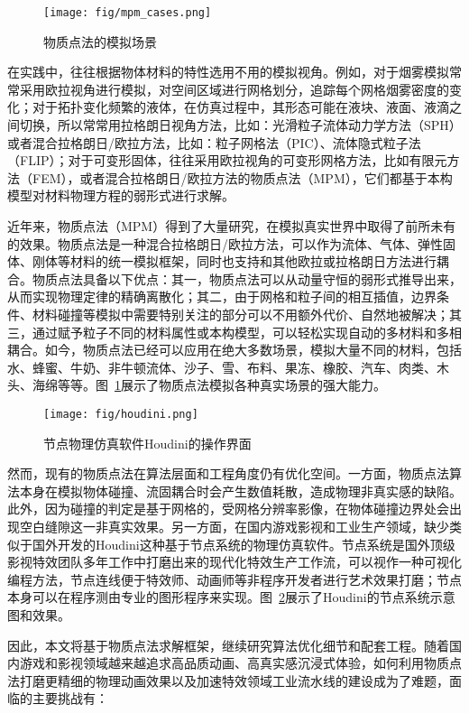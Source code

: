 \begin{figure}[htbp]
    \centering
    \texttt{[image: fig/mpm\_cases.png]}
    \caption{物质点法的模拟场景}
    \label{fig:mpm-cases}
\end{figure}

在实践中，往往根据物体材料的特性选用不用的模拟视角。例如，对于烟雾模拟常常采用欧拉视角进行模拟，对空间区域进行网格划分，追踪每个网格烟雾密度的变化；对于拓扑变化频繁的液体，在仿真过程中，其形态可能在液块、液面、液滴之间切换，所以常常用拉格朗日视角方法，比如：光滑粒子流体动力学方法（SPH）或者混合拉格朗日/欧拉方法，比如：粒子网格法（PIC）、流体隐式粒子法（FLIP）；对于可变形固体，往往采用欧拉视角的可变形网格方法，比如有限元方法（FEM），或者混合拉格朗日/欧拉方法的物质点法（MPM），它们都基于本构模型对材料物理方程的弱形式进行求解。

近年来，物质点法（MPM）得到了大量研究，在模拟真实世界中取得了前所未有的效果。物质点法是一种混合拉格朗日/欧拉方法，可以作为流体、气体、弹性固体、刚体等材料的统一模拟框架，同时也支持和其他欧拉或拉格朗日方法进行耦合。物质点法具备以下优点：其一，物质点法可以从动量守恒的弱形式推导出来，从而实现物理定律的精确离散化；其二，由于网格和粒子间的相互插值，边界条件、材料碰撞等模拟中需要特别关注的部分可以不用额外代价、自然地被解决；其三，通过赋予粒子不同的材料属性或本构模型，可以轻松实现自动的多材料和多相耦合。如今，物质点法已经可以应用在绝大多数场景，模拟大量不同的材料，包括水、蜂蜜、牛奶、非牛顿流体、沙子、雪、布料、果冻、橡胶、汽车、肉类、木头、海绵等等。图~\ref{fig:mpm-cases}展示了物质点法模拟各种真实场景的强大能力。

\begin{figure}[htbp]
    \centering
    \texttt{[image: fig/houdini.png]}
    \caption{节点物理仿真软件Houdini的操作界面}
    \label{fig:houdini}
\end{figure}

然而，现有的物质点法在算法层面和工程角度仍有优化空间。一方面，物质点法算法本身在模拟物体碰撞、流固耦合时会产生数值耗散，造成物理非真实感的缺陷。此外，因为碰撞的判定是基于网格的，受网格分辨率影像，在物体碰撞边界处会出现空白缝隙这一非真实效果。另一方面，在国内游戏影视和工业生产领域，缺少类似于国外开发的Houdini这种基于节点系统的物理仿真软件。节点系统是国外顶级影视特效团队多年工作中打磨出来的现代化特效生产工作流，可以视作一种可视化编程方法，节点连线便于特效师、动画师等非程序开发者进行艺术效果打磨；节点本身可以在程序测由专业的图形程序来实现。图~\ref{fig:houdini}展示了Houdini的节点系统示意图和效果。

因此，本文将基于物质点法求解框架，继续研究算法优化细节和配套工程。随着国内游戏和影视领域越来越追求高品质动画、高真实感沉浸式体验，如何利用物质点法打磨更精细的物理动画效果以及加速特效领域工业流水线的建设成为了难题，面临的主要挑战有：

